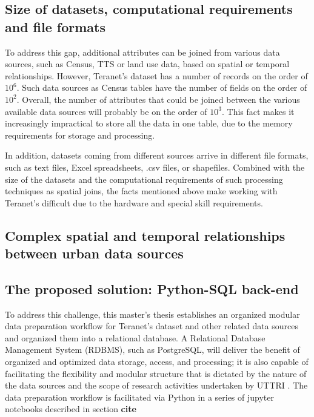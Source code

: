 \subsection{Size of datasets, computational requirements and file formats} \label{subsec:challenges_size_and_formats}

To address this gap, additional attributes can be joined from various data sources, such as Census, TTS or land use data, based on spatial or temporal relationships.
However, Teranet's dataset has a number of records on the order of $10^6$.
Such data sources as Census tables have the number of fields on the order of $10^2$.
Overall, the number of attributes that could be joined between the various available data sources will probably be on the order of $10^3$.
This fact makes it increasingly impractical to store all the data in one table, due to the memory requirements for storage and processing.

In addition, datasets coming from different sources arrive in different file formats, such as text files, Excel spreadsheets, .csv files, or shapefiles.
Combined with the size of the datasets and the computational requirements of such processing techniques as spatial joins, the facts mentioned above make working with Teranet's difficult due to the hardware and special skill requirements.

\subsection{Complex spatial and temporal relationships between urban data sources} \label{subsec:complex_spatio-temporal_relationships_between_urban_data_sources}


\subsection{The proposed solution: Python-SQL back-end} \label{subsec:proposed_solution_python_sql_backend}

To address this challenge, this master's thesis establishes an organized modular data preparation workflow for Teranet's dataset and other related data sources and organized them into a relational database.
A Relational Database Management System (RDBMS), such as PostgreSQL, will deliver the benefit of organized and optimized data storage, access, and processing;
it is also capable of facilitating the flexibility and modular structure that is dictated by the nature of the data sources and the scope of research activities undertaken by UTTRI .
The data preparation workflow is facilitated via Python in a series of jupyter notebooks described in section \textbf{cite}

